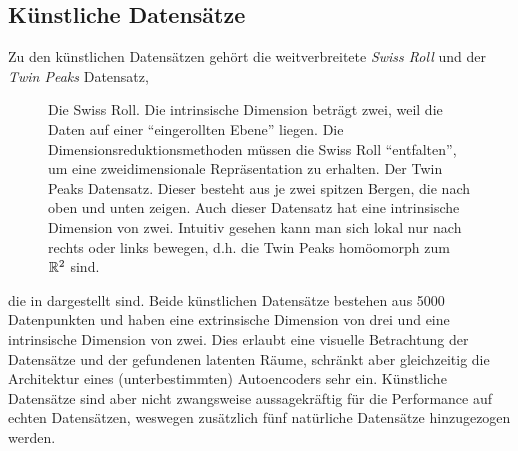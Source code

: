 \subsection{Künstliche Datensätze}
\label{ch:Vergleich:sec:VerwendeteDatensaetze:kuenstlich}
Zu den künstlichen Datensätzen gehört die weitverbreitete \textit{Swiss Roll} und der \textit{Twin Peaks} Datensatz,
\begin{figure}[ht]
	\begin{center}
		
	\end{center}
	\caption[Künstliche Datensätze]{\figleft Die Swiss Roll. Die intrinsische Dimension beträgt zwei, weil die Daten auf einer \enquote{eingerollten Ebene} liegen. Die Dimensionsreduktionsmethoden müssen die Swiss Roll \enquote{entfalten}, um eine zweidimensionale Repräsentation zu erhalten. \figright Der Twin Peaks Datensatz. Dieser besteht aus je zwei spitzen Bergen, die nach oben und unten zeigen. Auch dieser Datensatz hat eine intrinsische Dimension von zwei. Intuitiv gesehen kann man sich lokal nur nach rechts oder links bewegen, d.h. die Twin Peaks homöomorph zum $\mathbb{R}^2$ sind.}
	\label{fig:ArtificialDatasets}
\end{figure}
die in  dargestellt sind.
Beide künstlichen Datensätze bestehen aus 5000 Datenpunkten und haben eine extrinsische Dimension von drei und eine intrinsische
Dimension von zwei. Dies erlaubt eine visuelle Betrachtung der Datensätze und der gefundenen
latenten Räume, schränkt aber gleichzeitig die Architektur eines (unterbestimmten) Autoencoders
sehr ein. Künstliche Datensätze sind aber nicht zwangsweise aussagekräftig für die Performance auf echten Datensätzen, weswegen zusätzlich fünf natürliche Datensätze hinzugezogen werden.

